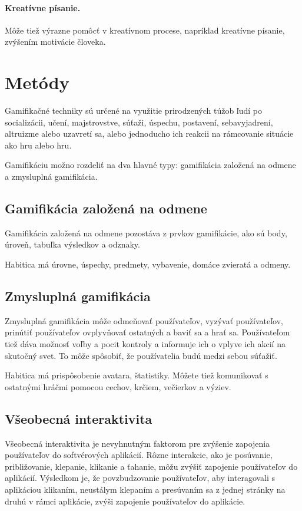 \documentclass[10pt,twoside,slovak,a4paper]{article}
\begin{document}
\paragraph{Kreatívne písanie.} Môže tiež výrazne pomôcť v kreatívnom procese, 
napríklad kreatívne písanie, zvýšením motivácie človeka.\cite{Creativity}

\section{Metódy} \label{methods}

Gamifikačné techniky sú určené na využitie prirodzených túžob ľudí po socializácii, učení, 
majstrovstve, súťaži, úspechu, postavení, sebavyjadrení, altruizme alebo uzavretí sa, alebo 
jednoducho ich reakcii na rámcovanie situácie ako hru alebo hru.\cite{Shallow}

Gamifikáciu možno rozdeliť na dva hlavné typy: gamifikácia založená na odmene a zmysluplná gamifikácia. \cite{Methods}

\subsection{Gamifikácia založená na odmene} \label{methods:reward}
Gamifikácia založená na odmene pozostáva z prvkov gamifikácie, ako sú body, úroveň, tabuľka výsledkov a odznaky.

\cite{Methods} Habitica má úrovne, úspechy, predmety, vybavenie, domáce zvieratá a odmeny.

\subsection{Zmysluplná gamifikácia} \label{methods:meaningful}
Zmysluplná gamifikácia môže odmeňovať používateľov, vyzývať používateľov, prinútiť používateľov 
ovplyvňovať ostatných a baviť sa a hrať sa. Používateľom tiež dáva možnosť voľby a pocit kontroly 
a informuje ich o vplyve ich akcií na skutočný svet. To môže spôsobiť, že používatelia 
budú medzi sebou súťažiť.\cite{Methods}

Habitica má prispôsobenie avatara, štatistiky. Môžete tiež komunikovať s ostatnými hráčmi 
pomocou cechov, krčiem, večierkov a výziev.

\subsection{Všeobecná interaktivita} \label{methods:interactivity}
Všeobecná interaktivita je nevyhnutným faktorom pre zvýšenie zapojenia používateľov do 
softvérových aplikácií. Rôzne interakcie, ako je posúvanie, približovanie, klepanie, klikanie a 
ťahanie, môžu zvýšiť zapojenie používateľov do aplikácií. Výsledkom je, že povzbudzovanie 
používateľov, aby interagovali s aplikáciou klikaním, neustálym klepaním a presúvaním sa z 
jednej stránky na druhú v rámci aplikácie, zvýši zapojenie používateľov do aplikácie.\cite{Methods}
\end{document}

